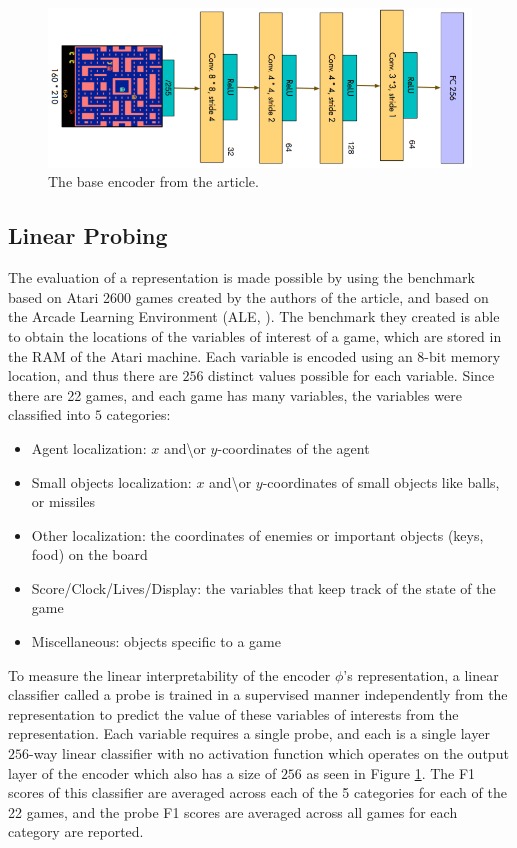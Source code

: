 \begin{figure}[H]
    \centering
    \includegraphics[scale=0.75]{../openreview/base_encoder.PNG}
    \caption{The base encoder from the article.}
    \label{fig:base-encoder-image}
\end{figure}

\subsection{Linear Probing}
The evaluation of a representation is made possible by using the benchmark based on Atari 2600 games created by the authors of the article, and based on the Arcade Learning Environment (ALE, \cite{ALE}). The benchmark they created is able to obtain the locations of the variables of interest of a game, which are stored in the RAM of the Atari machine. Each variable is encoded using an $8$-bit memory location, and thus there are $256$ distinct values possible for each variable. Since there are 22 games, and each game has many variables, the variables were classified into $5$ categories: 
\begin{itemize}
    \item Agent localization: $x$ and\textbackslash or $y$-coordinates of the agent
    \item Small objects localization: $x$ and\textbackslash or $y$-coordinates of small objects like balls, or missiles
    \item Other localization: the coordinates of enemies or important objects  (keys, food) on the board
    \item Score/Clock/Lives/Display: the variables that keep track of the state of the game
    \item Miscellaneous: objects specific to a game
\end{itemize}

To measure the linear interpretability of the encoder $\phi$'s representation, a linear classifier called a probe is trained in a supervised manner independently from the representation to predict the value of these variables of interests from the representation. Each variable requires a single probe, and each is a single layer $256$-way linear classifier with no activation function which operates on the output layer of the encoder which also has a size of $256$ as seen in Figure \ref{fig:base-encoder-image}. The F1 scores of this classifier are averaged across each of the 5 categories for each of the 22 games, and the probe F1 scores are averaged across all games for each category are reported.

